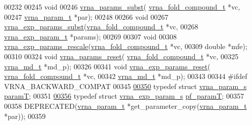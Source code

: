 \begin{DoxyCode}
00232 
00245 \textcolor{keywordtype}{void}
00246 \hyperlink{group__energy__parameters_ga5d1909208f7ea3baa98b75afaa1f62ca}{vrna\_params\_subst}( \hyperlink{group__fold__compound_structvrna__fc__s}{vrna\_fold\_compound\_t} *vc,
00247                     \hyperlink{group__energy__parameters_structvrna__param__s}{vrna\_param\_t} *par);
00248 
00266 \textcolor{keywordtype}{void}
00267 \hyperlink{group__energy__parameters_ga8e7ac4fab3b0cc03afbc134eaafb3525}{vrna\_exp\_params\_subst}(\hyperlink{group__fold__compound_structvrna__fc__s}{vrna\_fold\_compound\_t} *vc,
00268                       \hyperlink{group__energy__parameters_structvrna__exp__param__s}{vrna\_exp\_param\_t} *params);
00269 
00307 \textcolor{keywordtype}{void}
00308 \hyperlink{group__energy__parameters_gad607bc3a5b5da16400e2ca4ea5560233}{vrna\_exp\_params\_rescale}(\hyperlink{group__fold__compound_structvrna__fc__s}{vrna\_fold\_compound\_t} *vc,
00309                         \textcolor{keywordtype}{double} *mfe);
00310 
00324 \textcolor{keywordtype}{void} \hyperlink{group__energy__parameters_gac40dc82e48a72a97cfc58b9da08a7792}{vrna\_params\_reset}( \hyperlink{group__fold__compound_structvrna__fc__s}{vrna\_fold\_compound\_t} *vc,
00325                         \hyperlink{group__model__details_structvrna__md__s}{vrna\_md\_t} *md\_p);
00326 
00341 \textcolor{keywordtype}{void} \hyperlink{group__energy__parameters_gae3c6f8897fb1f824e7fa55ab179aa3e8}{vrna\_exp\_params\_reset}( \hyperlink{group__fold__compound_structvrna__fc__s}{vrna\_fold\_compound\_t} *vc,
00342                             \hyperlink{group__model__details_structvrna__md__s}{vrna\_md\_t} *md\_p);
00343 
00344 \textcolor{preprocessor}{#ifdef  VRNA\_BACKWARD\_COMPAT}
00345 
\hypertarget{params_8h_source_l00350}{}\hyperlink{group__energy__parameters_ga857dde86357d306cc902f0d8b2797659}{00350} \textcolor{keyword}{typedef} \textcolor{keyword}{struct }\hyperlink{group__energy__parameters_structvrna__param__s}{vrna\_param\_s}     \hyperlink{group__energy__parameters_structvrna__param__s}{paramT};
00351 
\hypertarget{params_8h_source_l00356}{}\hyperlink{group__energy__parameters_ga8bffe1828e2cbec101769f5cc0b1535b}{00356} \textcolor{keyword}{typedef} \textcolor{keyword}{struct }\hyperlink{group__energy__parameters_structvrna__exp__param__s}{vrna\_exp\_param\_s} \hyperlink{group__energy__parameters_structvrna__exp__param__s}{pf\_paramT};
00357 
00358 DEPRECATED(\hyperlink{group__energy__parameters_structvrna__param__s}{vrna\_param\_t} *get\_parameter\_copy(\hyperlink{group__energy__parameters_structvrna__param__s}{vrna\_param\_t} *par));
00359 

\end{DoxyCode}
